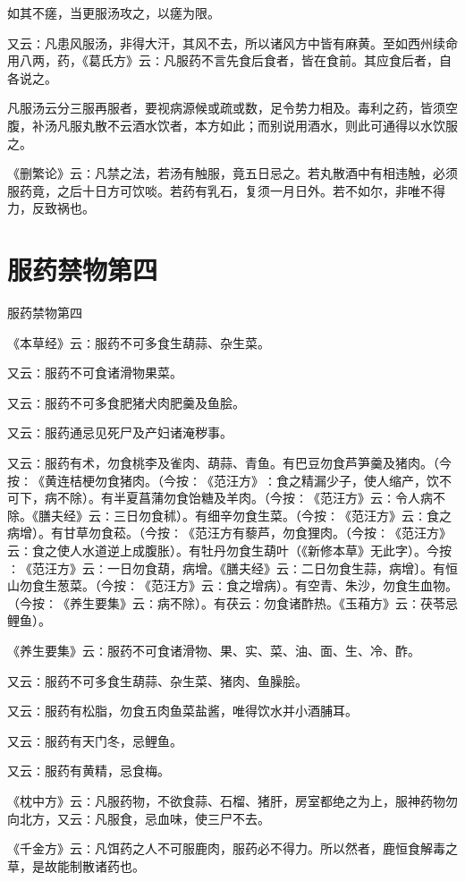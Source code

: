 \documentclass[a4paper,12pt,UTF8,twoside]{ctexbook}
\begin{document}
如其不瘥，当更服汤攻之，以瘥为限。

又云∶凡患风服汤，非得大汗，其风不去，所以诸风方中皆有麻黄。至如西州续命用八两，药，《葛氏方》云∶凡服药不言先食后食者，皆在食前。其应食后者，自各说之。

凡服汤云分三服再服者，要视病源候或疏或数，足令势力相及。毒利之药，皆须空腹，补汤凡服丸散不云酒水饮者，本方如此；而别说用酒水，则此可通得以水饮服之。

《删繁论》云∶凡禁之法，若汤有触服，竟五日忌之。若丸散酒中有相违触，必须服药竟，之后十日方可饮啖。若药有乳石，复须一月日外。若不如尔，非唯不得力，反致祸也。

\chapter{服药禁物第四}

服药禁物第四

《本草经》云∶服药不可多食生葫蒜、杂生菜。

又云∶服药不可食诸滑物果菜。

又云∶服药不可多食肥猪犬肉肥羹及鱼脍。

又云∶服药通忌见死尸及产妇诸淹秽事。

又云∶服药有术，勿食桃李及雀肉、葫蒜、青鱼。有巴豆勿食芦笋羹及猪肉。（今按∶《黄连桔梗勿食猪肉。（今按∶《范汪方》∶食之精漏少子，使人缩产，饮不可下，病不除）。有半夏菖蒲勿食饴糖及羊肉。（今按∶《范汪方》云∶令人病不除。《膳夫经》云∶三日勿食秫）。有细辛勿食生菜。（今按∶《范汪方》云∶食之病增）。有甘草勿食菘。（今按∶《范汪方有藜芦，勿食狸肉。（今按∶《范汪方》云∶食之使人水道逆上成腹胀）。有牡丹勿食生葫叶（《新修本草》无此字）。今按∶《范汪方》云∶一日勿食葫，病增。《膳夫经》云∶二日勿食生蒜，病增〕。有恒山勿食生葱菜。（今按∶《范汪方》云∶食之增病）。有空青、朱沙，勿食生血物。（今按∶《养生要集》云∶病不除）。有茯云∶勿食诸酢热。《玉葙方》云∶茯苓忌鲤鱼）。

《养生要集》云∶服药不可食诸滑物、果、实、菜、油、面、生、冷、酢。

又云∶服药不可多食生葫蒜、杂生菜、猪肉、鱼臊脍。

又云∶服药有松脂，勿食五肉鱼菜盐酱，唯得饮水并小酒脯耳。

又云∶服药有天门冬，忌鲤鱼。

又云∶服药有黄精，忌食梅。

《枕中方》云∶凡服药物，不欲食蒜、石榴、猪肝，房室都绝之为上，服神药物勿向北方，又云∶凡服食，忌血味，使三尸不去。

《千金方》云∶凡饵药之人不可服鹿肉，服药必不得力。所以然者，鹿恒食解毒之草，是故能制散诸药也。
\end{document}

